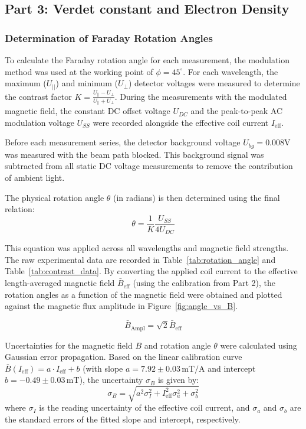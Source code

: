 \documentclass[a4paper]{article}
\begin{document}
\subsection{Part 3: Verdet constant and Electron Density}
\subsubsection{Determination of Faraday Rotation Angles}\label{sec:task9_angles}

To calculate the Faraday rotation angle for each measurement, the modulation method was used at the working point of $\phi = 45^\circ$. For each wavelength, the maximum ($U_{||}$) and minimum ($U_{\perp}$) detector voltages were measured to determine the contrast factor $K = \frac{U_{||} - U_{\perp}}{U_{||} + U_{\perp}}$. During the measurements with the modulated magnetic field, the constant DC offset voltage $U_{DC}$ and the peak-to-peak AC modulation voltage $U_{SS}$ were recorded alongside the effective coil current $I_{\mathrm{eff}}$.

Before each measurement series, the detector background voltage $U_{bg}=0.008$V was measured with the beam path blocked. This background signal was subtracted from all static DC voltage measurements to remove the contribution of ambient light.

The physical rotation angle $\theta$ (in radians) is then determined using the final relation:
\begin{equation}
  \theta = \frac{1}{K} \frac{U_{SS}}{4 U_{DC}}
  \label{eq:theta_calculation}
\end{equation}

This equation was applied across all wavelengths and magnetic field strengths. The raw experimental data are recorded in Table~\ref{tab:rotation_angle} and Table~\ref{tab:contrast_data}. By converting the applied coil current to the effective length-averaged magnetic field $\bar{B}_{\mathrm{eff}}$ (using the calibration from Part 2), the rotation angles as a function of the magnetic field were obtained and plotted against the magnetic flux amplitude in Figure~\ref{fig:angle_vs_B}.

\begin{equation}
  \bar{B}_{\mathrm{Ampl}} = \sqrt{2}\bar{B}_{\mathrm{eff}}
\end{equation}

Uncertainties for the magnetic field $B$ and rotation angle $\theta$ were calculated using Gaussian error propagation. Based on the linear calibration curve $\bar B(I_{\mathrm{eff}}) = a \cdot I_{\mathrm{eff}} + b$ (with slope $a = 7.92 \pm 0.03\,\mathrm{mT/A}$ and intercept $b = -0.49 \pm 0.03\,\mathrm{mT}$), the uncertainty $\sigma_B$ is given by:
\begin{equation}
  \sigma_B = \sqrt{a^2 \sigma_I^2 + I_{\mathrm{eff}}^2 \sigma_a^2 + \sigma_b^2}
  \label{eq:error_B}
\end{equation}
where $\sigma_I$ is the reading uncertainty of the effective coil current, and $\sigma_a$ and $\sigma_b$ are the standard errors of the fitted slope and intercept, respectively.
\end{document}
